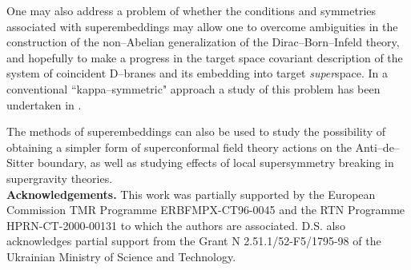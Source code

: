 \documentclass[a4paper,12pt]{article}
\begin{document}
One may also address a problem of whether the conditions and
symmetries associated with superembeddings may allow one to
overcome ambiguities in the construction of the non--Abelian
generalization of the Dirac--Born--Infeld theory, and hopefully
to make a progress in the target space covariant description of
the system of \coordHE{} coincident D--branes and its embedding into
target {\it super}space. In a conventional ``kappa--symmetric"
approach a study of this problem has been undertaken in \cite{em}.

The methods of superembeddings can also be used to study the
possibility of obtaining a simpler form of superconformal field
theory actions on the Anti--de--Sitter boundary, as well as
studying effects of local supersymmetry breaking in supergravity
theories.
\\

\noindent
{\bf Acknowledgements.} This work was partially supported by the
European Commission TMR Programme ERBFMPX-CT96-0045 and the RTN
Programme HPRN-CT-2000-00131 to which the authors are associated.
D.S. also acknowledges partial support from the Grant N
2.51.1/52-F5/1795-98 of the Ukrainian Ministry of Science and
Technology.

\end{document}

